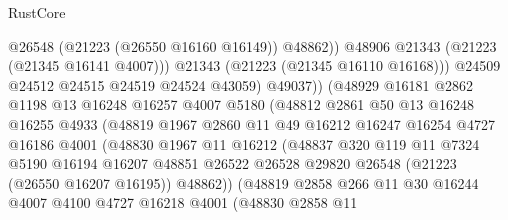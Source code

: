 \begin{lexlean}{RustCore}
\begin{coremodule}
                                  @26548
                                  (@21223 (@26550 @16160 @16149))
                                  @48862))
                              @48906
                              @21343
                              (@21223 (@21345 @16141 @4007)))
                            @21343
                            (@21223 (@21345 @16110 @16168)))
                          @24509
                          @24512
                          @24515
                          @24519
                          @24524
                          @43059)
                        @49037))
                    (@48929
                      @16181
                      @2862
                      @1198
                      @13
                      @16248
                      @16257
                      @4007
                      @5180
                      (@48812
                        @2861
                        @50
                        @13
                        @16248
                        @16255
                        @4933
                        (@48819
                          @1967
                          @2860
                          @11
                          @49
                          @16212
                          @16247
                          @16254
                          @4727
                          @16186
                          @4001
                          (@48830
                            @1967
                            @11
                            @16212
                            (@48837
                              @320
                              @119
                              @11
                              @7324
                              @5190
                              @16194
                              @16207
                              @48851
                              @26522
                              @26528
                              @29820
                              @26548
                              (@21223 (@26550 @16207 @16195))
                              @48862))
                          (@48819
                            @2858
                            @266
                            @11
                            @30
                            @16244
                            @4007
                            @4100
                            @4727
                            @16218
                            @4001
                            (@48830
                              @2858
                              @11

\end{coremodule}
\end{lexlean}
